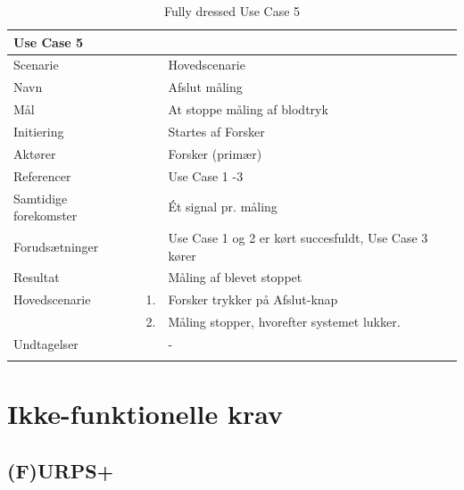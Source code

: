 \begin{longtabu} to  %
	{\large \textbf{Use Case 5}} && \\
	\toprule
	Scenarie && Hovedscenarie\\
	Navn && Afslut måling \\
	Mål && At stoppe måling af blodtryk\\
	Initiering && Startes af Forsker\\
	Aktører && Forsker (primær)\\
	Referencer && Use Case 1 -3  \\
	Samtidige forekomster  &&  Ét signal pr. måling\\
	Forudsætninger && Use Case 1 og 2 er kørt succesfuldt, Use Case 3 kører\\
	Resultat && Måling af blevet stoppet\\ \midrule
	Hovedscenarie &    1. &		Forsker trykker på Afslut-knap\\[-1ex] 
	&    2. &   Måling stopper, hvorefter systemet lukker. \\ \midrule	 	
	Undtagelser &    & - 	\\ \bottomrule
	\caption{Fully dressed Use Case 5}
	\label{UC5}
\end{longtabu}

\section{Ikke-funktionelle krav}


\subsection{(F)URPS+}

